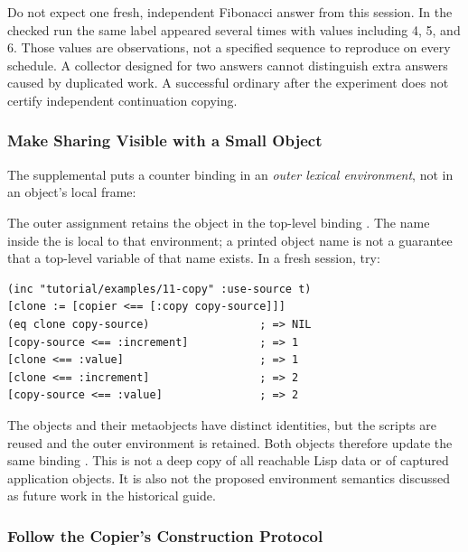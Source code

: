 Do not expect one fresh, independent Fibonacci answer from this session.
In the checked run the same  label appeared several times
with values including 4, 5, and 6. Those values are observations, not a
specified sequence to reproduce on every schedule. A collector designed
for two answers cannot distinguish extra answers caused by duplicated
work. A successful ordinary \code{[fib <== 5]} after the experiment does
not certify independent continuation copying.

\subsubsection{Make Sharing Visible with a Small Object}

The supplemental  puts a
counter binding in an \emph{outer lexical environment}, not in an object's
local  frame:


The outer assignment retains the object in the top-level binding
. The name  inside the 
is local to that environment; a printed object name is not a guarantee
that a top-level variable of that name exists.
In a fresh session, try:

\begin{codeblock}
\begin{lstlisting}
(inc "tutorial/examples/11-copy" :use-source t)
[clone := [copier <== [:copy copy-source]]]
(eq clone copy-source)                 ; => NIL
[copy-source <== :increment]           ; => 1
[clone <== :value]                     ; => 1
[clone <== :increment]                 ; => 2
[copy-source <== :value]               ; => 2
\end{lstlisting}
\end{codeblock}

The objects and their metaobjects have distinct identities, but the
scripts are reused and the outer environment is retained. Both objects
therefore update the same binding . This is not a deep copy
of all reachable Lisp data or of captured application objects.
It is also not the proposed  environment semantics discussed
as future work in the historical guide.

\subsubsection{Follow the Copier's Construction Protocol}

